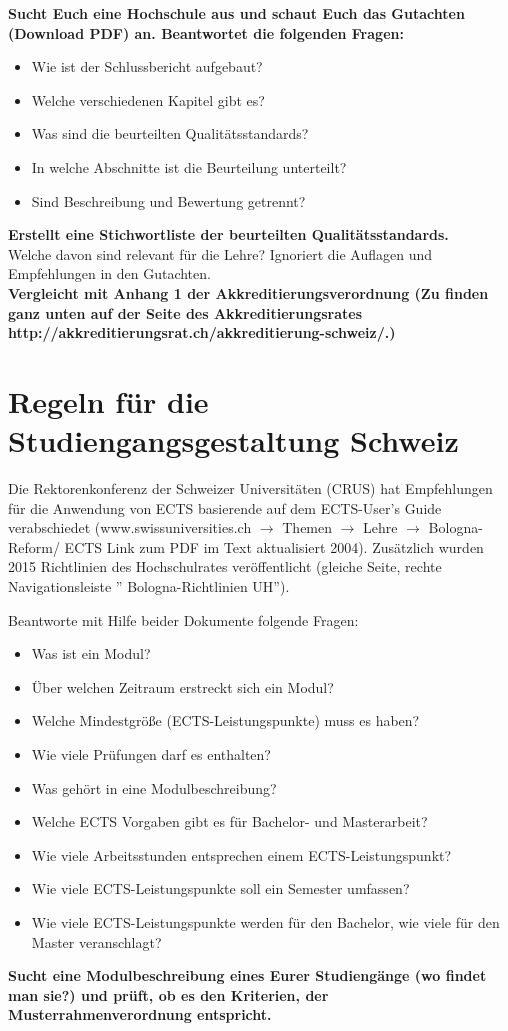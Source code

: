 \documentclass{scrartcl}
\begin{document}
\vspace{0.5 cm}
\textbf{Sucht Euch eine Hochschule aus und schaut Euch das Gutachten (Download PDF) an. Beantwortet die folgenden Fragen:}
\begin{itemize}
\item Wie ist der Schlussbericht aufgebaut?
\item Welche verschiedenen Kapitel gibt es?
\item Was sind die beurteilten Qualitätsstandards?
\item In welche Abschnitte ist die Beurteilung unterteilt?
\item Sind Beschreibung und Bewertung getrennt?
\end{itemize}
\vspace{0.5 cm}
\textbf{Erstellt eine Stichwortliste der beurteilten Qualitätsstandards.\\}
Welche davon sind relevant für die Lehre?
Ignoriert die Auflagen und Empfehlungen in den Gutachten.\\ 

\vspace{0.5 cm}
 \textbf{Vergleicht mit Anhang 1 der Akkreditierungsverordnung (Zu finden ganz unten auf der Seite des Akkreditierungsrates\\ http://akkreditierungsrat.ch/akkreditierung-schweiz/.)}

\newpage
\section*{Regeln für die Studiengangsgestaltung Schweiz}
Die Rektorenkonferenz der Schweizer Universitäten (CRUS) hat Empfehlungen für die Anwendung von ECTS basierende auf dem ECTS-User's Guide verabschiedet (www.swissuniversities.ch $\rightarrow$ Themen $\rightarrow$ Lehre $\rightarrow$ Bologna-Reform/ ECTS Link zum PDF im Text aktualisiert 2004). Zusätzlich wurden 2015 Richtlinien des Hochschulrates veröffentlicht (gleiche Seite, rechte Navigationsleiste '' Bologna-Richtlinien UH'').

\vspace{0.5 cm}

Beantworte mit Hilfe beider Dokumente folgende Fragen:
\begin{itemize}
	\item Was ist ein Modul?
	\item Über welchen Zeitraum erstreckt sich ein Modul?
	\item Welche Mindestgröße (ECTS-Leistungspunkte) muss es haben?
	\item Wie viele Prüfungen darf es enthalten?
	\item Was gehört in eine Modulbeschreibung?
	\item Welche ECTS Vorgaben gibt es für Bachelor- und Masterarbeit?
	\item Wie viele Arbeitsstunden entsprechen einem ECTS-Leistungspunkt?
	\item Wie viele ECTS-Leistungspunkte soll ein Semester umfassen?
	\item Wie viele ECTS-Leistungspunkte werden für den Bachelor, wie viele für den Master veranschlagt?
	\end{itemize}
	
\textbf{Sucht eine Modulbeschreibung eines Eurer Studiengänge (wo findet man sie?) und prüft, ob es den Kriterien, der Musterrahmenverordnung entspricht.}
\end{document}
